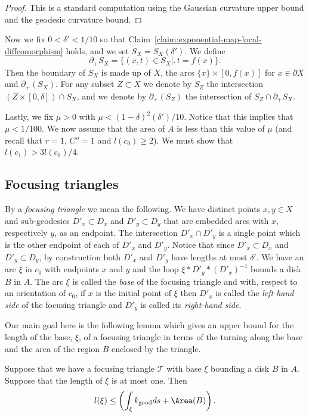 \begin{proof}
This is a standard computation using the Gaussian curvature upper
bound and the geodesic curvature bound.
\end{proof}

Now we fix $0<\delta'<1/10$ so that Claim~\ref{claim:exponential-map-local-diffeomorphism} holds, and
we set $S_X=S_X(\delta')$. We define
$$\partial_+S_X=\{(x,t)\in S_X \bigl|\bigr.\, t=f(x)\}.$$
Then the boundary of $S_X$ is made up of $X$, the arcs $\{x\}\times
[0,f(x)]$ for $x\in \partial X$ and $\partial_+(S_X)$. For any
subset $Z\subset X$ we denote by $S_Z$ the intersection $(Z\times
[0,\delta])\cap S_X$, and we denote by $\partial_+(S_Z)$ the
intersection of $S_Z\cap \partial_+S_X$.

Lastly, we fix $\mu>0$ with $\mu<(1-\delta)^2(\delta')/10$. Notice
that this implies that $\mu<1/100$. We now assume that the area of
$A$ is less than this value of $\mu$ (and recall that $r=1$, $C''=1$
and $l(c_0)\ge 2$). We must show that $l(c_1)>3l(c_0)/4$.



\subsection{Focusing triangles}

By a {\em focusing triangle} we mean the following. We have distinct
points $x,y\in X$ and sub-geodesics $D'_x\subset D_x$ and
$D'_y\subset D_y$ that are embedded arcs with $x$, respectively $y$,
as an endpoint. The intersection $D'_x\cap D'_y$ is a single point
which is the other endpoint of each of $D'_x$ and $D'_y$. Notice
that since $D'_x\subset D_x$ and $D'_y\subset D_y$, by construction
both $D'_x$ and $D'_y$ have lengths at most $\delta'$. We have an
arc $\xi$ in $c_0$ with endpoints $x$ and $y$ and the loop
$\xi*D'_y*(D'_x)^{-1}$ bounds a disk $B$ in $A$. The arc $\xi$ is
called the {\em base} of the focusing triangle and with, respect to
an orientation of $c_0$, if $x$ is the initial point of $\xi$ then
$D'_x$ is called the {\em left-hand side} of the focusing triangle
and $D'_y$ is called its {\em right-hand side}.

Our main goal here is the following lemma which gives an upper bound
for the length of the base, $\xi$, of a focusing triangle in terms
of the turning along the base and the area of the region $B$
enclosed by the triangle.

\begin{lemma}
\label{lem:focusing-triangle-base-length-bound}
\label{laest}
 Suppose that we have a focusing triangle ${\mathcal T}$ with base $\xi$ bounding a disk $B$
 in $A$.
 Suppose that the length of $\xi$ is at most one.
 Then
$$l(\xi)\le \left(\int_\xi k_\mathrm{geod}ds+\Area(B)\right).$$
\end{lemma}


